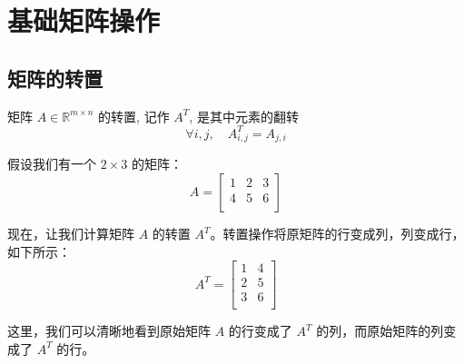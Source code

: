 \section{基础矩阵操作}




\subsection{矩阵的转置}

\begin{definition}
    
矩阵 $A \in \mathbb{R}^{m \times n}$ 的转置, 记作 $A^T$, 是其中元素的翻转
$$
\forall i, j, \quad A_{i, j}^T=A_{j, i}
$$
\end{definition}

\begin{exercise}
假设我们有一个 $2 \times 3$ 的矩阵：
$$
A = \begin{bmatrix}
1 & 2 & 3 \\
4 & 5 & 6 \\
\end{bmatrix}
$$

现在，让我们计算矩阵 $A$ 的转置 $A^T$。转置操作将原矩阵的行变成列，列变成行，如下所示：
$$
A^T = \begin{bmatrix}
1 & 4 \\
2 & 5 \\
3 & 6 \\
\end{bmatrix}
$$

这里，我们可以清晰地看到原始矩阵 $A$ 的行变成了 $A^T$ 的列，而原始矩阵的列变成了 $A^T$ 的行。
\end{exercise}

